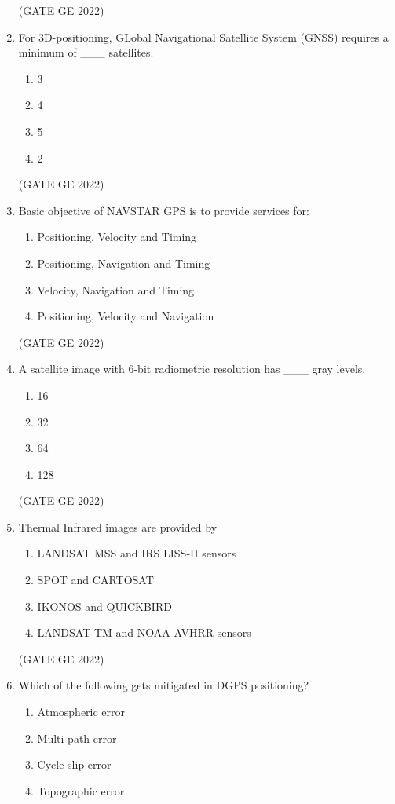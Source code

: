 \documentclass[a4paper, 11pt]{article}
\begin{document}
\begin{enumerate}
\hfill (GATE GE 2022)

\item For 3D-positioning, GLobal Navigational Satellite System (GNSS) requires a minimum of \_\_\_ satellites.
\begin{enumerate}
    \item 3
    \item 4
    \item 5
    \item 2
\end{enumerate}

\hfill (GATE GE 2022)

\item Basic objective of NAVSTAR GPS is to provide services for:
\begin{enumerate}
    \item Positioning, Velocity and Timing
    \item Positioning, Navigation and Timing
    \item Velocity, Navigation and Timing
    \item Positioning, Velocity and Navigation
\end{enumerate}

\hfill (GATE GE 2022)

\item A satellite image with 6-bit radiometric resolution has \_\_\_ gray levels.
\begin{enumerate}
    \item 16
    \item 32
    \item 64
    \item 128
\end{enumerate}

\hfill (GATE GE 2022)

\item Thermal Infrared images are provided by
\begin{enumerate}
    \item LANDSAT MSS and IRS LISS-II sensors
    \item SPOT and CARTOSAT
    \item IKONOS and QUICKBIRD
    \item LANDSAT TM and NOAA AVHRR sensors
\end{enumerate}

\hfill (GATE GE 2022)

\item Which of the following gets mitigated in DGPS positioning?
\begin{enumerate}
    \item Atmospheric error
    \item Multi-path error
    \item Cycle-slip error
    \item Topographic error
\end{enumerate}


\end{enumerate}
\end{document}

